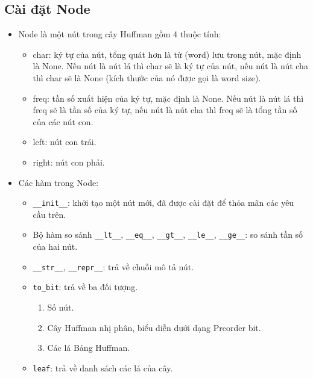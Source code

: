     \subsection{Cài đặt Node}
        \begin{itemize}
            \item Node là một nút trong cây Huffman gồm 4 thuộc tính:
                \begin{itemize}
                    \item char: ký tự của nút, tổng quát hơn là từ (word) lưu trong nút, mặc định là None. Nếu nút là nút lá thì char sẽ là ký tự của nút, nếu nút là nút cha thì char sẽ là None (kích thước của nó được gọi là word size).
                    \item freq: tần số xuất hiện của ký tự, mặc định là None. Nếu nút là nút lá thì freq sẽ là tần số của ký tự, nếu nút là nút cha thì freq sẽ là tổng tần số của các nút con.
                    \item left: nút con trái.
                    \item right: nút con phải.
                \end{itemize}
            \item Các hàm trong Node:
                \begin{itemize}
                    \item \lstinline{__init__}: khởi tạo một nút mới, đã được cài đặt để thỏa mãn các yêu cầu trên.
                    \item Bộ hàm so sánh \lstinline{__lt__}, \lstinline{__eq__}, \lstinline{__gt__},     \lstinline{__le__}, \lstinline{__ge__}: so sánh tần số của hai nút.
                    \item \lstinline{__str__}, \lstinline{__repr__}: trả về chuỗi mô tả nút.
                    \item \lstinline{to_bit}: trả về ba đối tượng.
                        \begin{enumerate}
                            \item Số nút.
                            \item Cây Huffman nhị phân, biểu diễn dưới dạng Preorder bit.
                            \item Các lá Bảng Huffman.
                        \end{enumerate}
                    \item \lstinline{leaf}: trả về danh sách các lá của cây.
                \end{itemize}
            \end{itemize}
